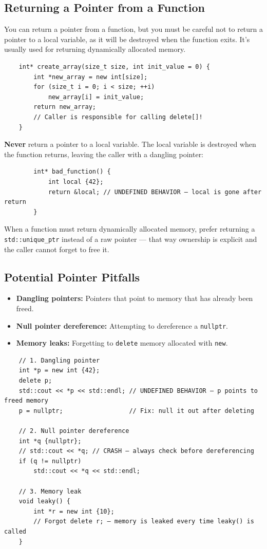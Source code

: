 \subsection{Returning a Pointer from a Function}
You can return a pointer from a function, but you must be careful not to return a pointer to a local variable, as it will be destroyed when the function exits. It's usually used for returning dynamically allocated memory.
\begin{lstlisting}
	int* create_array(size_t size, int init_value = 0) {
		int *new_array = new int[size];
		for (size_t i = 0; i < size; ++i)
			new_array[i] = init_value;
		return new_array;
		// Caller is responsible for calling delete[]!
	}
\end{lstlisting}

\begin{remark}
	\textbf{Never} return a pointer to a local variable. The local variable is destroyed when the function returns, leaving the caller with a dangling pointer:
	\begin{lstlisting}
		int* bad_function() {
			int local {42};
			return &local; // UNDEFINED BEHAVIOR — local is gone after return
		}
	\end{lstlisting}
	When a function must return dynamically allocated memory, prefer returning a \texttt{std::unique\_ptr} instead of a raw pointer — that way ownership is explicit and the caller cannot forget to free it.
\end{remark}

\subsection{Potential Pointer Pitfalls}
\begin{itemize}
	\item \textbf{Dangling pointers:} Pointers that point to memory that has already been freed.
	\item \textbf{Null pointer dereference:} Attempting to dereference a \texttt{nullptr}.
	\item \textbf{Memory leaks:} Forgetting to \texttt{delete} memory allocated with \texttt{new}.
\end{itemize}

\begin{example}{\leavevmode}
\begin{lstlisting}
	// 1. Dangling pointer
	int *p = new int {42};
	delete p;
	std::cout << *p << std::endl; // UNDEFINED BEHAVIOR — p points to freed memory
	p = nullptr;                  // Fix: null it out after deleting

	// 2. Null pointer dereference
	int *q {nullptr};
	// std::cout << *q; // CRASH — always check before dereferencing
	if (q != nullptr)
		std::cout << *q << std::endl;

	// 3. Memory leak
	void leaky() {
		int *r = new int {10};
		// Forgot delete r; — memory is leaked every time leaky() is called
	}
\end{lstlisting}
\end{example}

